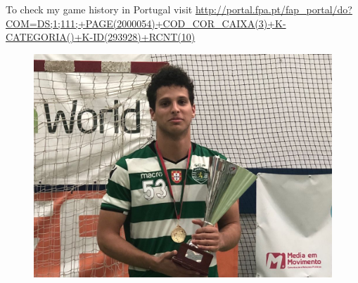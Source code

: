 \documentclass[9pt]{developercv} %
\begin{document}
To check my game history in Portugal visit \quad \url{http://portal.fpa.pt/fap_portal/do?COM=DS;1;111;+PAGE(2000054)+COD_COR_CAIXA(3)+K-CATEGORIA()+K-ID(293928)+RCNT(10)}


\begin{figure} [h]
\center
\includegraphics[scale=0.2]{eu}
\end{figure}

%
%

\end{document}
